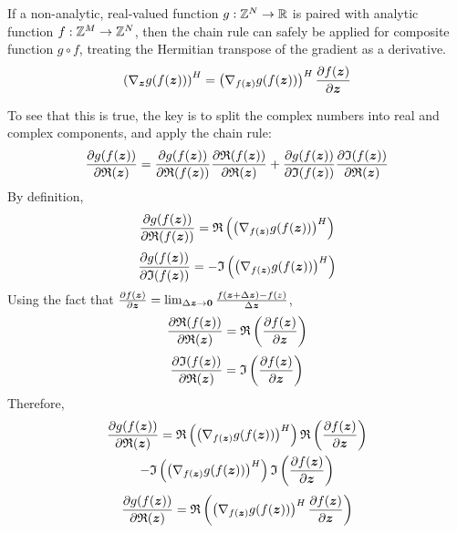 \begin{appendices}
If a non-analytic, real-valued function $g: \mathbb{Z}^N \rightarrow \mathbb{R}$ is paired with analytic function $f: \mathbb{Z}^M \rightarrow \mathbb{Z}^N$, then the chain rule can safely be applied for composite function $g \circ f$, treating the Hermitian transpose of the gradient as a derivative.
\begin{equation} \label{equation:Complex Chain Rule}
\left(\nabla_{\bm{z}} g(f(\bm{z}))\right)^H = \left( \nabla_{f(\bm{z})} g(f(\bm{z}))\right)^H \frac{\partial f(\bm{z})}{\partial \bm{z}}
\end{equation}

To see that this is true, the key is to split the complex numbers into real and complex components, and apply the chain rule:
\begin{equation}
\frac{\partial g(f(\bm{z}))}{\partial \mathfrak{R}(\bm{z})} = \frac{\partial g(f(\bm{z}))}{\partial \mathfrak{R}(f(\bm{z}))}\frac{\partial \mathfrak{R}(f(\bm{z}))}{\partial \mathfrak{R}(\bm{z})} + \frac{\partial g(f(\bm{z}))}{\partial \mathfrak{I}(f(\bm{z}))}\frac{\partial \mathfrak{I}(f(\bm{z}))}{\partial \mathfrak{R}(\bm{z})}
\end{equation}
By definition,
\begin{equation}
\frac{\partial g(f(\bm{z}))}{\partial \mathfrak{R}(f(\bm{z}))} = \mathfrak{R}\left(\left(\nabla_{f(\bm{z})} g(f(\bm{z}))\right)^H\right)
\end{equation}
\begin{equation}
\frac{\partial g(f(\bm{z}))}{\partial \mathfrak{I}(f(\bm{z}))} = -\mathfrak{I}\left(\left(\nabla_{f(\bm{z})} g(f(\bm{z}))\right)^H\right)
\end{equation}
Using the fact that $\frac{\partial f(\bm{z})}{\partial \bm{z}} = \lim_{\Delta \bm{z} \rightarrow \bm{0}} \frac{f(\bm{z} + \Delta \bm{z}) - f(z)}{\Delta \bm{z}}$,
\begin{equation}
\frac{\partial \mathfrak{R}(f(\bm{z}))}{\partial \mathfrak{R}(\bm{z})} = \mathfrak{R}\left(\frac{\partial f(\bm{z})}{\partial \bm{z}}\right)
\end{equation}
\begin{equation}
\frac{\partial \mathfrak{I}(f(\bm{z}))}{\partial \mathfrak{R}(\bm{z})} = \mathfrak{I}\left(\frac{\partial f(\bm{z})}{\partial \bm{z}}\right)
\end{equation}
Therefore,
\begin{multline}
\frac{\partial g(f(\bm{z}))}{\partial \mathfrak{R}(\bm{z})} = \mathfrak{R}\left(\left(\nabla_{f(\bm{z})} g(f(\bm{z}))\right)^H\right)\mathfrak{R}\left(\frac{\partial f(\bm{z})}{\partial \bm{z}}\right) \\- \mathfrak{I}\left(\left(\nabla_{f(\bm{z})} g(f(\bm{z}))\right)^H\right)\mathfrak{I}\left(\frac{\partial f(\bm{z})}{\partial \bm{z}}\right)
\end{multline}
\begin{equation} \label{equation:Partial Derivative for Real Component}
\frac{\partial g(f(\bm{z}))}{\partial \mathfrak{R}(\bm{z})} = \mathfrak{R}\left(\left(\nabla_{f(\bm{z})} g(f(\bm{z}))\right)^H\frac{\partial f(\bm{z})}{\partial \bm{z}}\right)
\end{equation}


\end{appendices}
